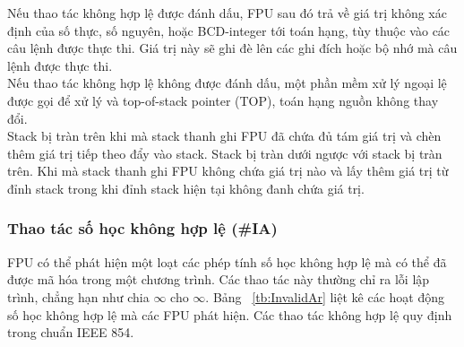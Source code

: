 		Nếu thao tác không hợp lệ được đánh dấu, FPU sau đó trả về giá trị không xác định của số thực, số nguyên, hoặc BCD-integer tới toán hạng, tùy thuộc vào các câu lệnh được thực thi. Giá trị này sẽ ghi đè lên các ghi đích hoặc bộ nhớ mà câu lệnh được thực thi.\\
		
		Nếu thao tác không hợp lệ không được đánh dấu, một phần mềm xử lý ngoại lệ được gọi để xử lý và top-of-stack pointer (TOP), toán hạng nguồn không thay đổi.\\
		
		Stack bị tràn trên khi mà stack thanh ghi FPU đã chứa đủ tám giá trị và chèn thêm giá trị tiếp theo đẩy vào stack. Stack bị tràn dưới ngược với stack bị tràn trên. Khi mà stack thanh ghi FPU không chứa giá trị nào và lấy thêm giá trị từ đỉnh stack trong khi đỉnh stack hiện tại không đanh chứa giá trị.
		
		\subsubsection*{Thao tác số học không hợp lệ (\#IA)}
		FPU có thể phát hiện một loạt các phép tính số học không hợp lệ mà có thể đã được mã hóa trong một chương trình. Các thao tác này thường chỉ ra lỗi lập trình, chẳng hạn như chia $\mathbb{\infty}$ cho $\mathbb{\infty}$. Bảng ~\ref{tb:InvalidAr}  liệt kê các hoạt động số học không hợp lệ mà các FPU phát hiện. Các thao tác không hợp lệ quy định trong chuẩn IEEE 854.\\
		
